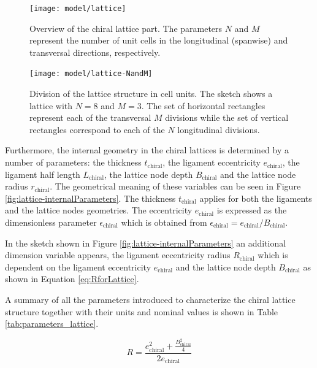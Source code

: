     \begin{figure}[!htpb]
      \centering
      \texttt{[image: model/lattice]}
      \caption[Overview of the chiral lattice part]{Overview of the chiral lattice part. The parameters $N$ and $M$ represent the number of unit cells in the longitudinal (spanwise) and transversal directions, respectively.}\label{fig:lattice}
    \end{figure}

    \begin{figure}[!htpb]
      \centering
      \texttt{[image: model/lattice-NandM]}
      \caption[Division of the lattice structure in cell units]{Division of the lattice structure in cell units. The sketch shows a lattice with $N = 8$ and $M = 3$. The set of horizontal rectangles represent each of the transversal $M$ divisions while the set of vertical rectangles correspond to each of the $N$ longitudinal divisions.}\label{fig:lattice-NandM}
    \end{figure}

    \clearpage
    Furthermore, the internal geometry in the chiral lattices is determined by a number of parameters: the thickness $t_{\mathrm{chiral}}$, the ligament eccentricity $e_{\mathrm{chiral}}$, the ligament half length $L_{\mathrm{chiral}}$, the lattice node depth $B_{\mathrm{chiral}}$ and the lattice node radius $r_{\mathrm{chiral}}$. The geometrical meaning of these variables can be seen in Figure \ref{fig:lattice-internalParameters}. The thickness $t_{\mathrm{chiral}}$ applies for both the ligaments and the lattice nodes geometries. The eccentricity $e_{\mathrm{chiral}}$ is expressed as the dimensionless parameter $\epsilon_{\mathrm{chiral}}$ which is obtained from $\epsilon_{\mathrm{chiral}} = e_{\mathrm{chiral}} / B_{\mathrm{chiral}}$.

    In the sketch shown in Figure \ref{fig:lattice-internalParameters} an additional dimension variable appears, the ligament eccentricity radius $R_{\mathrm{chiral}}$ which is dependent on the ligament eccentricity $e_{\mathrm{chiral}}$ and the lattice node depth $B_{\mathrm{chiral}}$ as shown in Equation \ref{eq:RforLattice}.

    A summary of all the parameters introduced to characterize the chiral lattice structure together with their units and nominal values is shown in Table \ref{tab:parameters_lattice}.

    \begin{equation}\label{eq:RforLattice}
      R = \frac{e_{\mathrm{chiral}}^2 + \frac{B_{\mathrm{chiral}}^2}{4}}{2e_{\mathrm{chiral}}}
    \end{equation}


